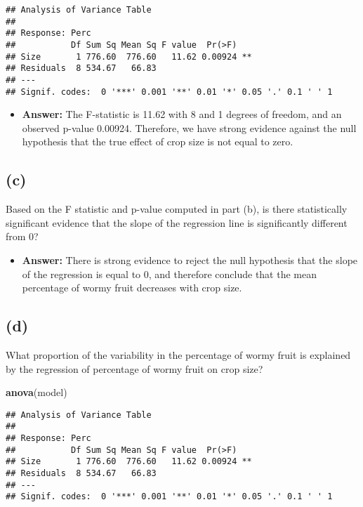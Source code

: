 \documentclass[]{article}
\newenvironment{Shaded}{\begin{snugshade}}{\end{snugshade}}
\newcommand{\KeywordTok}[1]{\textcolor[rgb]{0.13,0.29,0.53}{\textbf{#1}}}
\newcommand{\NormalTok}[1]{#1}
\providecommand{\tightlist}{%
  \setlength{\itemsep}{0pt}\setlength{\parskip}{0pt}}
\begin{document}
\begin{verbatim}
## Analysis of Variance Table
## 
## Response: Perc
##           Df Sum Sq Mean Sq F value  Pr(>F)   
## Size       1 776.60  776.60   11.62 0.00924 **
## Residuals  8 534.67   66.83                   
## ---
## Signif. codes:  0 '***' 0.001 '**' 0.01 '*' 0.05 '.' 0.1 ' ' 1
\end{verbatim}

\begin{itemize}
\tightlist
\item
  \textbf{Answer:} The F-statistic is 11.62 with 8 and 1 degrees of
  freedom, and an observed p-value 0.00924. Therefore, we have strong
  evidence against the null hypothesis that the true effect of crop size
  is not equal to zero.
\end{itemize}

\subsection{(c)}\label{c-2}

Based on the F statistic and p-value computed in part (b), is there
statistically significant evidence that the slope of the regression line
is significantly different from 0?

\begin{itemize}
\tightlist
\item
  \textbf{Answer:} There is strong evidence to reject the null
  hypothesis that the slope of the regression is equal to 0, and
  therefore conclude that the mean percentage of wormy fruit decreases
  with crop size.
\end{itemize}

\subsection{(d)}\label{d-2}

What proportion of the variability in the percentage of wormy fruit is
explained by the regression of percentage of wormy fruit on crop size?

\begin{Shaded}
\begin{Highlighting}[]
\KeywordTok{anova}\NormalTok{(model)}
\end{Highlighting}
\end{Shaded}

\begin{verbatim}
## Analysis of Variance Table
## 
## Response: Perc
##           Df Sum Sq Mean Sq F value  Pr(>F)   
## Size       1 776.60  776.60   11.62 0.00924 **
## Residuals  8 534.67   66.83                   
## ---
## Signif. codes:  0 '***' 0.001 '**' 0.01 '*' 0.05 '.' 0.1 ' ' 1
\end{verbatim}
\end{document}
